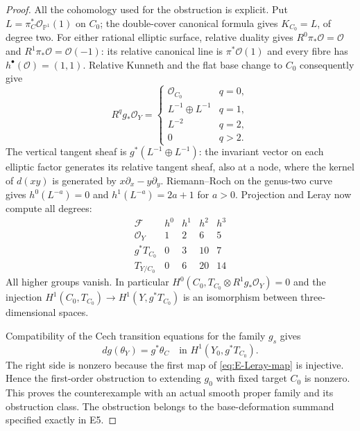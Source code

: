 \begin{proof}
All the cohomology used for the obstruction is explicit. Put
$L=\pi_C^*\mathcal O_{\mathbb P^1}(1)$ on $C_0$; the
double-cover canonical formula gives $K_{C_0}=L$, of degree two.
For either rational elliptic surface, relative duality gives
$R^0\pi_*\mathcal O=\mathcal O$ and
$R^1\pi_*\mathcal O=\mathcal O(-1)$: its relative canonical
line is $\pi^*\mathcal O(1)$ and every fibre has
$h^\bullet(\mathcal O)=(1,1)$. Relative Kunneth and the flat
base change to $C_0$ consequently give
\[
 R^qg_*\mathcal O_Y=
 \begin{cases}
  \mathcal O_{C_0}&q=0,\\
  L^{-1}\oplus L^{-1}&q=1,\\
  L^{-2}&q=2,\\
  0&q>2.
 \end{cases}
\]
The vertical tangent sheaf is $g^*(L^{-1}\oplus L^{-1})$:
the invariant vector on each elliptic factor generates its
relative tangent sheaf, also at a node, where the kernel of
$d(xy)$ is generated by $x\partial_x-y\partial_y$.
Riemann--Roch on the genus-two curve gives
$h^0(L^{-a})=0$ and $h^1(L^{-a})=2a+1$ for $a>0$.
Projection and Leray now compute all degrees:
\[
\begin{array}{c|rrrr}
 \mathcal F&h^0&h^1&h^2&h^3\\\hline
 \mathcal O_Y&1&2&6&5\\
 g^*T_{C_0}&0&3&10&7\\
 T_{Y/C_0}&0&6&20&14
\end{array}
\]
All higher groups vanish. In particular
$H^0(C_0,T_{C_0}\otimes R^1g_*\mathcal O_Y)=0$ and the
injection $H^1(C_0,T_{C_0})\to H^1(Y,g^*T_{C_0})$ is an
isomorphism between three-dimensional spaces.

Compatibility of the Cech transition equations for the family
$g_s$ gives
\[
 dg(\theta_Y)=g^*\theta_C
       \quad\text{in }H^1(Y_0,g^*T_{C_0}).
\]
The right side is nonzero because the first map of
\eqref{eq:E-Leray-map} is injective. Hence the first-order
obstruction to extending $g_0$ with fixed target $C_0$ is nonzero.
This proves the counterexample with an actual smooth proper
family and its obstruction class. The obstruction belongs to
the base-deformation summand specified exactly in E5.
\end{proof}



